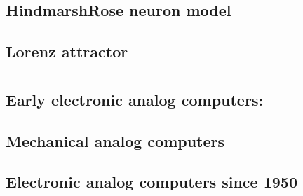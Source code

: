 \documentclass[letterpaper,10pt,english]{sphinxmanual}
\begin{document}
\section{Hindmarsh\sphinxhyphen{}Rose neuron model}
\label{\detokenize{rst/applications/hindmarsh-rose_neuron:hindmarsh-rose-neuron-model}}\label{\detokenize{rst/applications/hindmarsh-rose_neuron::doc}}\label{\detokenize{rst/applications/hindmarsh-rose_neuron::doc}}

\section{Lorenz attractor}
\label{\detokenize{rst/applications/lorenz_attractor:lorenz-attractor}}\label{\detokenize{rst/applications/lorenz_attractor::doc}}

\chapter{}
\label{\detokenize{index:history}}

\section{Early electronic analog computers:}
\label{\detokenize{rst/history_first_electronic_analog_computers:early-electronic-analog-computers}}\label{\detokenize{rst/history_first_electronic_analog_computers::doc}}

\section{Mechanical analog computers}
\label{\detokenize{rst/history_mechanical_analog_computers:mechanical-analog-computers}}\label{\detokenize{rst/history_mechanical_analog_computers::doc}}

\section{Electronic analog computers since 1950}
\label{\detokenize{rst/history_system_examples_1950-now:electronic-analog-computers-since-1950}}\label{\detokenize{rst/history_system_examples_1950-now::doc}}


\renewcommand{\indexname}{Index}
\printindex
\end{document}
